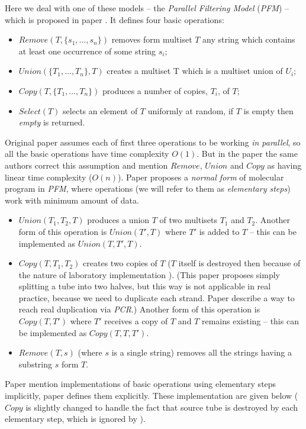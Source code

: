Here we deal with one of these models -- the \emph{Parallel Filtering Model} (\emph{PFM}) -- which is proposed in paper \cite{Amos:1996}. It defines four basic operations:
\begin{itemize}
	\item $Remove(T, \{s_1, \dots, s_n\})$ removes form multiset $T$ any string which contains at least one occurrence of some string $s_i$;
	\item $Union(\{T_1, \dots, T_n\}, T)$ creates a multiset T which is a multiset union of $U_i$;
	\item $Copy(T, \{T_1, \dots, T_n\})$ produces a number of copies, $T_i$, of $T$;
	\item $Select(T)$ selects an element of $T$ uniformly at random, if $T$ is empty then \emph{empty} is returned.
\end{itemize}
Original paper \cite{Amos:1996} assumes each of first three operations to be working \emph{in parallel}, so all the basic operations have time complexity $O(1)$. But in the paper \cite{Amos:1997} the same authors correct this assumption and mention $Remove$, $Union$ and $Copy$ as having linear time complexity ($O(n)$). 
Paper \cite{Katsanyi:2003} proposes a \emph{normal form} of molecular program in \emph{PFM}, where operations (we will refer to them as \emph{elementary steps}) work with minimum amount of data.
\begin{itemize}
	\item $Union(T_1, T_2, T)$ produces a union $T$ of two multisets $T_1$ and $T_2$. Another form of this operation is $Union(T', T)$ where $T'$ is added to $T$ -- this can be implemented as $Union(T, T', T)$.
	\item $Copy(T, T_1, T_2)$ creates two copies of $T$ ($T$ itself is destroyed then because of the nature of laboratory implementation \cite{Amos:1996}). (This paper proposes simply splitting a tube into two halves, but this way is not applicable in real practice, because we need to duplicate each strand. Paper \cite{Adleman:1994} describe a way to reach real duplication via \emph{PCR}.) Another form of this operation is $Copy(T, T')$ where $T'$ receives a copy of $T$ and $T$ remains existing -- this can be implemented as $Copy(T, T, T')$.
	\item $Remove(T, s)$ (where $s$ is a single string) removes all the strings having a substring $s$ form $T$.
\end{itemize}

Paper \cite{Amos:1997} mention implementations of basic operations using elementary steps implicitly, paper \cite{Katsanyi:2003} defines them explicitly. These implementation are given below ($Copy$ is slightly changed to handle the fact that source tube is destroyed by each elementary step, which is ignored by \cite{Katsanyi:2003}).

